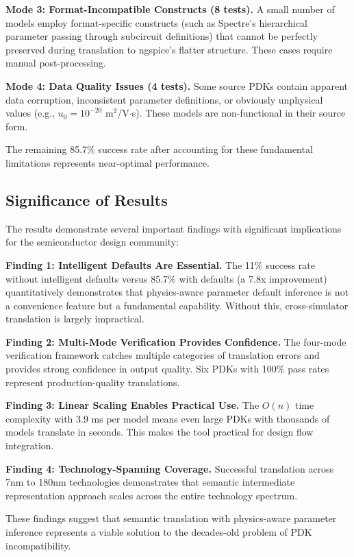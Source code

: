 \documentclass[10pt,twocolumn]{article}
\begin{document}
\textbf{Mode 3: Format-Incompatible Constructs (8 tests).} A small number of models employ format-specific constructs (such as Spectre's hierarchical parameter passing through subcircuit definitions) that cannot be perfectly preserved during translation to ngspice's flatter structure. These cases require manual post-processing.

\textbf{Mode 4: Data Quality Issues (4 tests).} Some source PDKs contain apparent data corruption, inconsistent parameter definitions, or obviously unphysical values (e.g., $u_0 = 10^{-20}$ m$^2$/V$\cdot$s). These models are non-functional in their source form.

The remaining 85.7\% success rate after accounting for these fundamental limitations represents near-optimal performance.

\subsection{Significance of Results}

The results demonstrate several important findings with significant implications for the semiconductor design community:

\textbf{Finding 1: Intelligent Defaults Are Essential.} The 11\% success rate without intelligent defaults versus 85.7\% with defaults (a 7.8x improvement) quantitatively demonstrates that physics-aware parameter default inference is not a convenience feature but a fundamental capability. Without this, cross-simulator translation is largely impractical.

\textbf{Finding 2: Multi-Mode Verification Provides Confidence.} The four-mode verification framework catches multiple categories of translation errors and provides strong confidence in output quality. Six PDKs with 100\% pass rates represent production-quality translations.

\textbf{Finding 3: Linear Scaling Enables Practical Use.} The $O(n)$ time complexity with 3.9 ms per model means even large PDKs with thousands of models translate in seconds. This makes the tool practical for design flow integration.

\textbf{Finding 4: Technology-Spanning Coverage.} Successful translation across 7nm to 180nm technologies demonstrates that semantic intermediate representation approach scales across the entire technology spectrum.

These findings suggest that semantic translation with physics-aware parameter inference represents a viable solution to the decades-old problem of PDK incompatibility.
\end{document}
